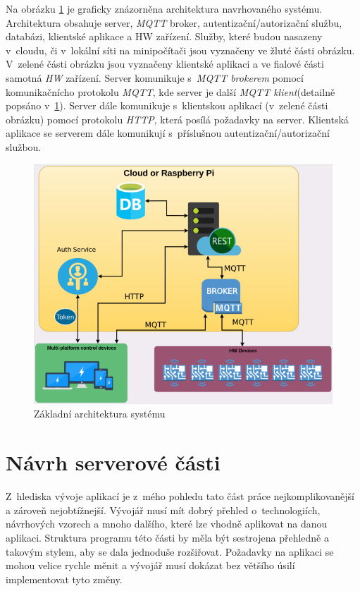 Na obrázku \ref{figure:architektura} je graficky znázorněna architektura navrhovaného systému.
Architektura obsahuje server, \emph{MQTT} broker, autentizační/autorizační službu, databázi, klientské aplikace a HW zařízení.
Služby, které budou nasazeny v~cloudu, či v~lokální síti na minipočítači jsou vyznačeny ve žluté části obrázku.
V~zelené části obrázku jsou vyznačeny klientské aplikaci a ve fialové části samotná \emph{HW} zařízení.
Server komunikuje s~\emph{MQTT brokerem} pomocí komunikačnícho protokolu \emph{MQTT}, kde server je další \emph{MQTT klient}(detailně popsáno v~\ref{navrh:backend}).
Server dále komunikuje s~klientskou aplikací (v~zelené části obrázku) pomocí protokolu \emph{HTTP}, která posílá požadavky na server.
Klientská aplikace se serverem dále komunikují s~příslušnou autentizační/autorizační službou.

\begin{figure}[hbt]
  \centering
  \includegraphics[width=0.8 \linewidth]{obrazky-figures/navrh.png}
  \caption{Základní architektura systému}
  \label{figure:architektura}
\end{figure}

\section{Návrh serverové části}
\label{navrh:backend}
Z~hlediska vývoje aplikací je z~mého pohledu tato část práce nejkomplikovanější a zároveň nejobtížnejší.
Vývojář musí mít dobrý přehled o~technologiích, návrhových vzorech a mnoho dalšího, které lze vhodně aplikovat na danou aplikaci.
Struktura programu této části by měla být sestrojena přehledně a takovým stylem, aby se dala jednoduše rozšiřovat.
Požadavky na aplikaci se mohou velice rychle měnit a vývojář musí dokázat bez většího úsilí implementovat tyto změny.

